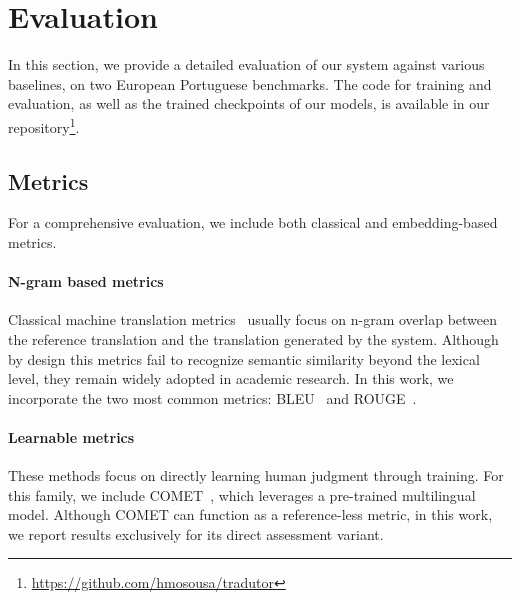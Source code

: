 \section{Evaluation}
\label{sec:eval}
In this section, we provide a detailed evaluation of our system against various baselines, on two European Portuguese benchmarks. 
The code for training and evaluation, as well as the trained checkpoints of our models, is available in our repository\footnote{\url{https://github.com/hmosousa/tradutor}}.

\subsection{Metrics}

For a comprehensive evaluation, we include both classical and embedding-based metrics.

\paragraph{N-gram based metrics} Classical machine translation metrics~\cite{Popovic2015,Papineni2002,Lin2004,Banerjee2005} usually focus on n-gram overlap between the reference translation and the translation generated by the system. Although by design this metrics fail to recognize semantic similarity beyond the lexical level, they remain widely adopted in academic research. In this work, we incorporate the two most common metrics: BLEU~\cite{Papineni2002} and ROUGE~\cite{Lin2004}.



\paragraph{Learnable metrics}
These methods focus on directly learning human judgment through training. 
For this family, we include COMET~\cite{Rei2020}, which leverages a pre-trained multilingual model. Although COMET can function as a reference-less metric, in this work, we report results exclusively for its direct assessment variant.



